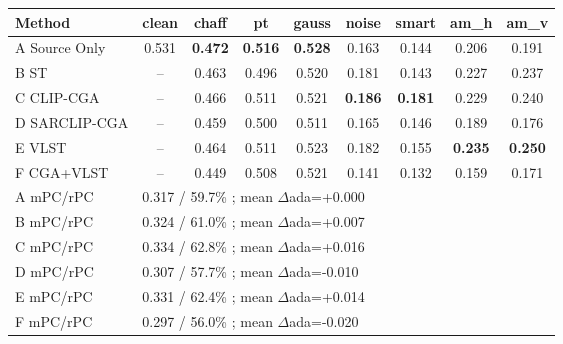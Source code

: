 \begin{tabular}{lcccccccc}
\toprule
Method & clean & chaff & pt & gauss & noise & smart & am\_h & am\_v \\
\midrule
A Source Only & 0.531 & \textbf{0.472} & \textbf{0.516} & \textbf{0.528} & 0.163 & 0.144 & 0.206 & 0.191 \\
B ST & -- & 0.463 & 0.496 & 0.520 & 0.181 & 0.143 & 0.227 & 0.237 \\
C CLIP-CGA & -- & 0.466 & 0.511 & 0.521 & \textbf{0.186} & \textbf{0.181} & 0.229 & 0.240 \\
D SARCLIP-CGA & -- & 0.459 & 0.500 & 0.511 & 0.165 & 0.146 & 0.189 & 0.176 \\
E VLST & -- & 0.464 & 0.511 & 0.523 & 0.182 & 0.155 & \textbf{0.235} & \textbf{0.250} \\
F CGA+VLST & -- & 0.449 & 0.508 & 0.521 & 0.141 & 0.132 & 0.159 & 0.171 \\
\midrule
A mPC/rPC & \multicolumn{8}{l}{0.317 / 59.7\% ; mean $\Delta$ada=+0.000} \\
B mPC/rPC & \multicolumn{8}{l}{0.324 / 61.0\% ; mean $\Delta$ada=+0.007} \\
C mPC/rPC & \multicolumn{8}{l}{0.334 / 62.8\% ; mean $\Delta$ada=+0.016} \\
D mPC/rPC & \multicolumn{8}{l}{0.307 / 57.7\% ; mean $\Delta$ada=-0.010} \\
E mPC/rPC & \multicolumn{8}{l}{0.331 / 62.4\% ; mean $\Delta$ada=+0.014} \\
F mPC/rPC & \multicolumn{8}{l}{0.297 / 56.0\% ; mean $\Delta$ada=-0.020} \\
\bottomrule
\end{tabular}
